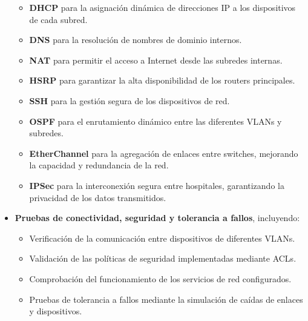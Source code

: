 \begin{itemize}
    \begin{itemize}
        \item \textbf{DHCP} para la asignación dinámica de direcciones IP a los dispositivos de cada subred.
        \item \textbf{\ac{DNS}} para la resolución de nombres de dominio internos.
        \item \textbf{\ac{NAT}} para permitir el acceso a Internet desde las subredes internas.
        \item \textbf{\ac{HSRP}} para garantizar la alta disponibilidad de los routers principales.
        \item \textbf{\ac{SSH}} para la gestión segura de los dispositivos de red.
        \item \textbf{\ac{OSPF}} para el enrutamiento dinámico entre las diferentes VLANs y subredes.
        \item \textbf{EtherChannel} para la agregación de enlaces entre switches, mejorando la capacidad y redundancia de la red.
        \item \textbf{\ac{IPSec}} para la interconexión segura entre hospitales, garantizando la privacidad de los datos transmitidos.
    \end{itemize}
    \item \textbf{Pruebas de conectividad, seguridad y tolerancia a fallos}, incluyendo:
    \begin{itemize}
        \item Verificación de la comunicación entre dispositivos de diferentes VLANs.
        \item Validación de las políticas de seguridad implementadas mediante ACLs.
        \item Comprobación del funcionamiento de los servicios de red configurados.
        \item Pruebas de tolerancia a fallos mediante la simulación de caídas de enlaces y dispositivos.
    \end{itemize}
\end{itemize}

